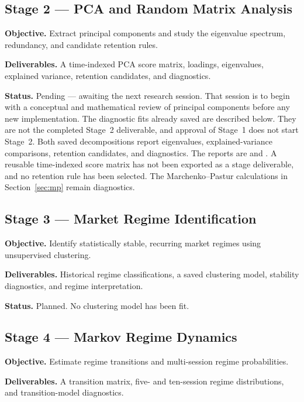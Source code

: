 \documentclass[11pt]{article}
\begin{document}
\subsection{Stage 2 --- PCA and Random Matrix Analysis}

\textbf{Objective.} Extract principal components and study the eigenvalue spectrum, redundancy, and candidate retention rules.

\textbf{Deliverables.} A time-indexed PCA score matrix, loadings, eigenvalues, explained variance, retention candidates, and diagnostics.

\textbf{Status.} Pending --- awaiting the next research session.
That session is to begin with a conceptual and mathematical review of principal components before any new implementation.
The diagnostic fits already saved are described below.
They are not the completed Stage~2 deliverable, and approval of Stage~1 does not start Stage~2.
Both saved decompositions report eigenvalues, explained-variance comparisons, retention candidates, and diagnostics.
The reports are  and .
A reusable time-indexed score matrix has not been exported as a stage deliverable, and no retention rule has been selected.
The Marchenko--Pastur calculations in Section~\ref{sec:mp} remain diagnostics.

\subsection{Stage 3 --- Market Regime Identification}

\textbf{Objective.} Identify statistically stable, recurring market regimes using unsupervised clustering.

\textbf{Deliverables.} Historical regime classifications, a saved clustering model, stability diagnostics, and regime interpretation.

\textbf{Status.} Planned.
No clustering model has been fit.

\subsection{Stage 4 --- Markov Regime Dynamics}

\textbf{Objective.} Estimate regime transitions and multi-session regime probabilities.

\textbf{Deliverables.} A transition matrix, five- and ten-session regime distributions, and transition-model diagnostics.
\end{document}
